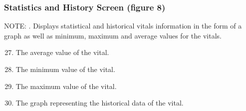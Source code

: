 \subsubsection{Statistics and History Screen (figure 8)}
NOTE: . Displays statistical and historical vitals information in the form of a graph as well as minimum, maximum and average values for the vitals.
\begin{enumerate}
\setcounter{enumi}{26}
	\item The average value of the vital. 
	\item The minimum value of the vital. 
	\item The maximum value of the vital. 
	\item The graph representing the historical data of the vital. 
\end{enumerate}
